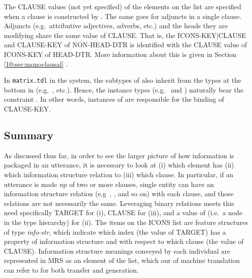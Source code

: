 
\noindent The CLAUSE values (not yet specified) of the elements on the
 list are specified when a clause is constructed by
. The same goes for adjuncts in a
single clause.  Adjuncts (e.g.\ attributive adjectives, adverbs, etc.)
and the heads they are modifying share the same value of
CLAUSE. That is, the ICONS-KEY{$\mid$}CLAUSE
and CLAUSE-KEY of NON-HEAD-DTR is identified with the CLAUSE value of
ICONS-KEY of HEAD-DTR. More information about this is given in
Section \ref{10:sec:monoclausal}
.





In \texttt{matrix.tdl} in the \lingo {} system, the
subtypes of  also inherit from the types at the
bottom in  (e.g.\ ,
etc.). Hence, the instance types (e.g.\ 
and ) naturally bear the constraint
. In other words, instances of
 are responsible for the binding of CLAUSE-KEY.




\subsection{Summary}
\label{9:ssec:icons-summary}

As discussed thus far, in order to see the larger picture of how
information is packaged in an utterance, it is necessary to look at
(i) which element has (ii) which information structure relation to
(iii) which clause. In particular, if an utterance is made up of two
or more clauses, single entity can have an information structure
relation (e.g\ , , and so on) with each clause, and those
relations are not necessarily the
same. Leveraging binary
relations meets this need specifically TARGET for (i), CLAUSE for
(iii), and a value of  (i.e.\ a
node in the type hierarchy) for (ii). The items on the ICONS list are
feature structures of type \textit{info-str}, which indicate which
index (the value of TARGET) has a property of information structure
and with respect to which clause (the value of CLAUSE).  Information
structure meanings conveyed by each individual are represented in MRS
as an element of the  list, which our
 of machine translation can refer to for both
transfer and generation.



